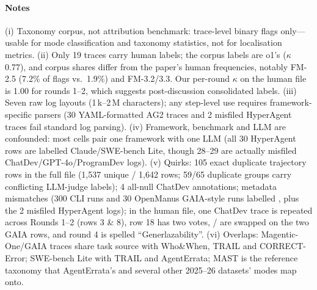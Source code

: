 \paragraph{Notes} (i) Taxonomy corpus, not attribution benchmark: trace-level binary flags only---usable for mode classification and taxonomy statistics, not for localisation metrics. (ii) Only 19 traces carry human labels; the corpus labels are o1's ($\kappa$ 0.77), and corpus shares differ from the paper's human frequencies, notably FM-2.5 (7.2\% of flags vs.\ 1.9\%) and FM-3.2/3.3. Our per-round $\kappa$ on the human file is 1.00 for rounds 1--2, which suggests post-discussion consolidated labels. (iii) Seven raw log layouts (1\,k--2\,M characters); any step-level use requires framework-specific parsers (30 YAML-formatted AG2 traces and 2 misfiled HyperAgent traces fail standard log parsing). (iv) Framework, benchmark and LLM are confounded: most cells pair one framework with one LLM (all 30 HyperAgent rows are labelled Claude/SWE-bench Lite, though  28--29 are actually misfiled ChatDev/GPT-4o/ProgramDev logs). (v) Quirks: 105 exact duplicate trajectory rows in the full file (1,537 unique / 1,642 rows; 59/65 duplicate groups carry conflicting LLM-judge labels); 4 all-null ChatDev annotations; metadata mismatches (300  CLI runs and 30 OpenManus GAIA-style runs labelled , plus the 2 misfiled HyperAgent logs); in the human file, one ChatDev trace is repeated across Rounds 1--2 (rows 3 \& 8), row 18 has two  votes, / are swapped on the two GAIA rows, and round 4 is spelled ``Generlazability''. (vi) Overlaps: Magentic-One/GAIA traces share task source with Who\&When, TRAIL and CORRECT-Error; SWE-bench Lite with TRAIL and AgentErrata; MAST is the reference taxonomy that AgentErrata's and several other 2025--26 datasets' modes map onto.
